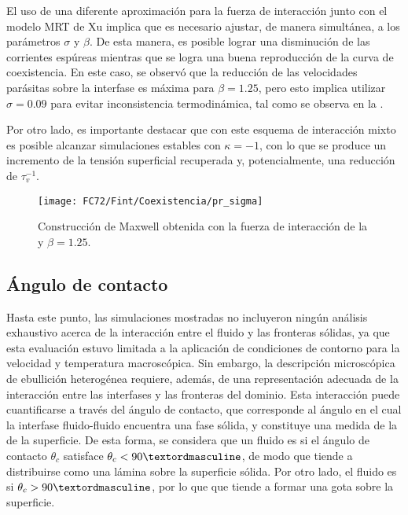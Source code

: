 El uso de una diferente aproximaci\'on para la fuerza de interacci\'on junto con el modelo MRT de Xu implica que es necesario ajustar, de manera simult\'anea, a los par\'ametros $\sigma$ y $\beta$. De esta manera, es posible lograr una disminuci\'on de las corrientes esp\'ureas mientras que se logra una buena reproducci\'on de la curva de coexistencia. En este caso, se observ\'o que la reducci\'on de las velocidades par\'asitas sobre la interfase es m\'axima para $\beta=1.25$, pero esto implica utilizar $\sigma=0.09$ para evitar inconsistencia termodin\'amica, tal como se observa en la .

Por otro lado, es importante destacar que con este esquema de interacci\'on mixto es posible alcanzar simulaciones estables con $\kappa=-1$, con lo que se produce un incremento de la tensi\'on superficial recuperada y, potencialmente, una reducci\'on de $\tau_v^{-1}$.

\begin{figure}[ht]
	\centering
	\texttt{[image: FC72/Fint/Coexistencia/pr\_sigma]}
	\caption{Construcci\'on de Maxwell obtenida con la fuerza de interacci\'on de la  y $\beta=1.25$.}
	\label{fig:pr_sigma_beta}
\end{figure}
\FloatBarrier



\subsection{\'Angulo de contacto}

Hasta este punto, las simulaciones mostradas no incluyeron ning\'un an\'alisis exhaustivo acerca de la interacci\'on entre el fluido y las fronteras s\'olidas, ya que esta evaluaci\'on estuvo limitada a la aplicaci\'on de condiciones de contorno para la velocidad y temperatura macrosc\'opica. Sin embargo, la descripci\'on microsc\'opica de ebullici\'on heterog\'enea requiere, adem\'as, de una representaci\'on adecuada de la interacci\'on entre las interfases y las fronteras del dominio. Esta interacci\'on puede cuantificarse a trav\'es del \'angulo de contacto, que corresponde al \'angulo en el cual la interfase fluido-fluido encuentra una fase s\'olida, y constituye una medida de la  de la superficie. De esta forma, se considera que un fluido es  si el \'angulo de contacto $\theta_c$ satisface $\theta_c < 90 \textordmasculine$, de modo que tiende a distribuirse como una l\'amina sobre la superficie s\'olida. Por otro lado, el fluido es  si $\theta_c > 90 \textordmasculine$, por lo que que tiende a formar una gota sobre la superficie.


